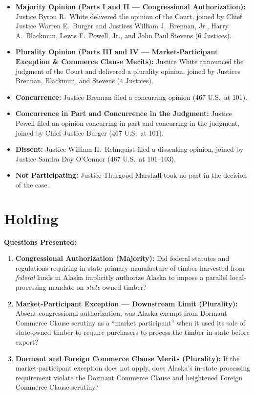 \documentclass[12pt]{article}
\begin{document}
\begin{itemize}
        \item \textbf{Majority Opinion (Parts I and II --- Congressional Authorization):} Justice Byron R.\ White delivered the opinion of the Court, joined by Chief Justice Warren E.\ Burger and Justices William J.\ Brennan, Jr., Harry A.\ Blackmun, Lewis F.\ Powell, Jr., and John Paul Stevens (6 Justices).
        \item \textbf{Plurality Opinion (Parts III and IV --- Market-Participant Exception \& Commerce Clause Merits):} Justice White announced the judgment of the Court and delivered a plurality opinion, joined by Justices Brennan, Blackmun, and Stevens (4 Justices).
        \item \textbf{Concurrence:} Justice Brennan filed a concurring opinion (467 U.S.\ at 101).
        \item \textbf{Concurrence in Part and Concurrence in the Judgment:} Justice Powell filed an opinion concurring in part and concurring in the judgment, joined by Chief Justice Burger (467 U.S.\ at 101).
        \item \textbf{Dissent:} Justice William H.\ Rehnquist filed a dissenting opinion, joined by Justice Sandra Day O'Connor (467 U.S.\ at 101--103).
        \item \textbf{Not Participating:} Justice Thurgood Marshall took no part in the decision of the case.

\end{itemize}

\section{Holding}
\textbf{Questions Presented:}

\begin{enumerate}
    \item \textbf{Congressional Authorization (Majority):} Did federal statutes and regulations requiring in-state primary manufacture of timber harvested from \emph{federal} lands in Alaska implicitly authorize Alaska to impose a parallel local-processing mandate on \emph{state}-owned timber?
    \item \textbf{Market-Participant Exception --- Downstream Limit (Plurality):} Absent congressional authorization, was Alaska exempt from Dormant Commerce Clause scrutiny as a ``market participant'' when it used its sale of state-owned timber to require purchasers to process the timber in-state before export?
    \item \textbf{Dormant and Foreign Commerce Clause Merits (Plurality):} If the market-participant exception does not apply, does Alaska's in-state processing requirement violate the Dormant Commerce Clause and heightened Foreign Commerce Clause scrutiny?
\end{enumerate}
\end{document}
